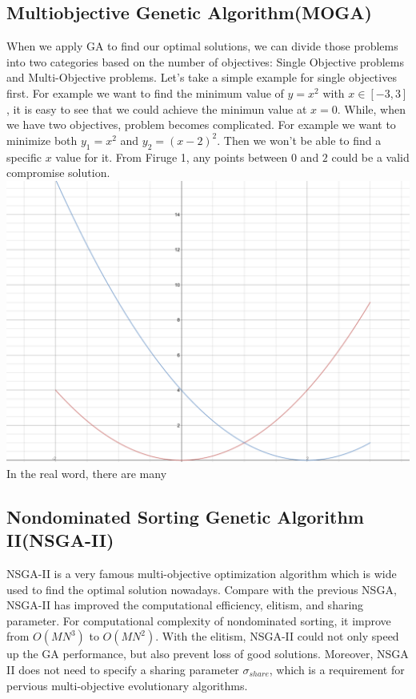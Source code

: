 \subsection{Multiobjective Genetic Algorithm(MOGA)}
When we apply GA to find our optimal solutions, we can divide those problems into two categories based on the number of objectives: Single Objective problems and Multi-Objective problems. Let's take a simple example for single objectives first. For example we want to find the minimum value of \(y=x^2\) with \(x\in [-3,3]\), it is easy to see that we could achieve the minimun value at \(x=0\). While, when we have two objectives, problem becomes complicated. For example we want to minimize both \(y_{1}=x^2\) and \(y_{2}=(x-2)^2\). Then we won't be able to find a specific \(x\) value for it. From Firuge 1, any points between \(0\) and \(2\) could be a valid compromise solution. 
\includegraphics[scale=.4]{images/Firgure_1.png}
In the real word, there are many

\subsection{Nondominated Sorting Genetic Algorithm II(NSGA-II)}
NSGA-II\cite{NSGA-II} is a very famous multi-objective optimization algorithm which is wide used  to find the optimal solution nowadays. Compare with the previous NSGA, NSGA-II has improved the computational efficiency, elitism, and sharing parameter. For computational complexity of nondominated sorting, it improve from \(O(MN^{3})\) to \(O(MN^{2})\). With the elitism, NSGA-II could not only speed up the GA performance, but also prevent loss of good solutions. Moreover, NSGA II does not need to specify a sharing parameter \(\sigma_{share}\), which is a requirement for pervious multi-objective evolutionary algorithms.
